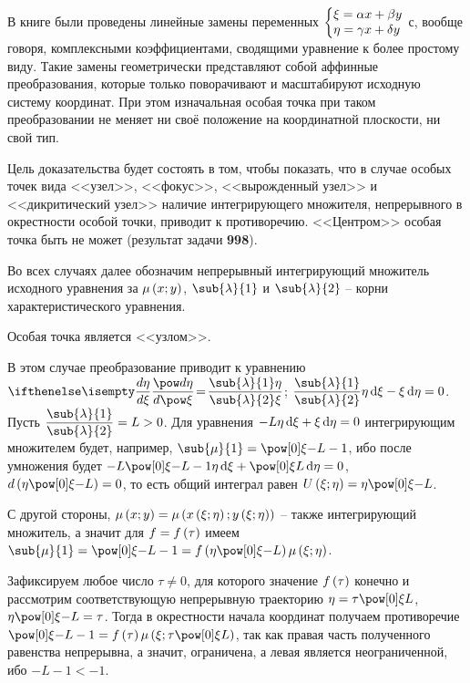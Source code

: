 \documentclass[a5paper,10pt]{article}
\begin{document}
В книге были проведены линейные замены переменных 
$\tsys{\xi = \alpha x + \beta y \\ \eta = \gamma x + \delta y}$ 
с, вообще говоря, комплексными коэффициентами, сводящими уравнение к более простому виду. 
Такие замены геометрически представляют собой аффинные преобразования, 
которые только поворачивают и масштабируют исходную систему координат. 
При этом изначальная особая точка при таком преобразовании не меняет ни своё положение на 
координатной плоскости, ни свой тип.

Цель доказательства будет состоять в том, чтобы показать, что в случае особых точек
вида <<узел>>, <<фокус>>, <<вырожденный узел>> и <<дикритический узел>> наличие 
интегрирующего множителя, непрерывного в окрестности особой точки, приводит к противоречию. 
<<Центром>> особая точка быть не может (результат задачи \textbf{998}).

Во всех случаях далее обозначим непрерывный интегрирующий множитель исходного уравнения
за $\mu\left(\hspace{0.01em}x; y\hspace{0.01em}\right)$, $\sub{\lambda}{1}$ и $\sub{\lambda}{2}$ -- корни характеристического уравнения.

\begin{case}[1] Особая точка является <<узлом>>. \end{case}
В этом случае преобразование приводит к уравнению
$\der{\eta}{\xi} \!=\! \dfrac {\sub{\lambda}{1} \eta} {\sub{\lambda}{2} \xi}$;
$\dfrac {\sub{\lambda}{1}} {\sub{\lambda}{2}} \eta \di \xi - \xi \di \eta = 0$.
Пусть $\dfrac {\sub{\lambda}{1}} {\sub{\lambda}{2}} = L > 0$.
Для уравнения
$- L \eta \di \xi + \xi \di \eta = 0$
интегрирующим множителем будет, например, $\sub{\mu}{1} = \tpow{\xi}{-L - 1}$, 
ибо после умножения будет
$-L \tpow{\xi}{-L - 1} \eta \di \xi + \tpow{\xi}{L} \di \eta = 0$,
$d\br{\eta \tpow{\xi}{-L}} = 0$,
то есть общий интеграл равен $U\br{\xi; \eta} = \eta \tpow{\xi}{-L}$.

С другой стороны, $\mu\left(\hspace{0.01em}x; y\hspace{0.01em}\right) = \mu\left(\hspace{0.01em}x\left(\hspace{0.01em}\xi; \eta\hspace{0.01em}\right); y\left(\hspace{0.01em}\xi; \eta\hspace{0.01em}\right)\hspace{0.01em}\right)$ -- также 
интегрирующий множитель, а значит для $f = f\left(\hspace{0.01em}\tau\hspace{0.01em}\right)$ имеем
$\sub{\mu}{1} = \tpow{\xi}{-L - 1} = f\br{\eta \tpow{\xi}{-L}} \mu\br{\xi; \eta}$.

Зафиксируем любое число $\tau \ne 0$, для которого значение $f\left(\hspace{0.01em}\tau\hspace{0.01em}\right)$ конечно и
рассмотрим \linebreak соответствующую непрерывную траекторию
$\eta = \tau \tpow{\xi}{L}$, $\eta \tpow{\xi}{-L} = \tau$.
Тогда в окрестности начала координат получаем противоречие
$\tpow{\xi}{-L - 1} = f\br{\tau} \mu\br{\xi; \tau \tpow{\xi}{L}}$,
так как правая часть полученного равенства непрерывна, а значит, ограничена, а левая является
неограниченной, ибо $-L - 1 < -1$.
\end{document}
